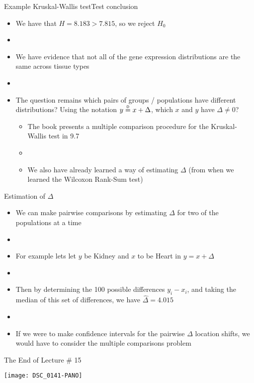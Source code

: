 \documentclass[xcolor=dvipsnames]{beamer}
\newcommand\myeq{\mathrel{\overset{\makebox[0pt]{\mbox{\normalfont\tiny\sffamily D}}}{=}}}
\begin{document}
\begin{frame}{Example Kruskal-Wallis test}{Test conclusion}
	\begin{itemize}
		\item We have that $H = 8.183 > 7.815$, so we reject $H_0$ \pause
		\item[]
		\item We have evidence that not all of the gene expression distributions are the same across tissue types \pause
		\item[]
		\item The question remains which pairs of groups / populations have different distributions? Using the notation $y \myeq x + \Delta$, which $x$ and $y$ have $\Delta \neq 0$? \pause
		\begin{itemize}
			\item The book presents a multiple comparison procedure for the Kruskal-Wallis test in 9.7 \pause
			\item[]
			\item We also have already learned a way of estimating $\Delta$ (from when we learned the Wilcoxon Rank-Sum test)
		\end{itemize}
	\end{itemize}
\end{frame}

\begin{frame}{Estimation of $\Delta$}
	\begin{itemize}
		\item We can make pairwise comparisons by estimating $\Delta$ for two of the populations at a time \pause
		\item[]
		\item For example lets let $y$ be Kidney and $x$ to be Heart in $y = x + \Delta$ \pause
		\item[]
		\item Then by determining the 100 possible differences $y_i - x_i$, and taking the median of this set of differences, we have $\hat{\Delta} = 4.015$ \pause
		\item[]
		\item If we were to make confidence intervals for the pairwise $\Delta$ location shifts, we would have to consider the multiple comparisons problem
	\end{itemize}
\end{frame}

\begin{frame}{The End of Lecture \# 15}
	\begin{center}
		\texttt{[image: DSC\_0141-PANO]}
	\end{center}
\end{frame}
\end{document}
